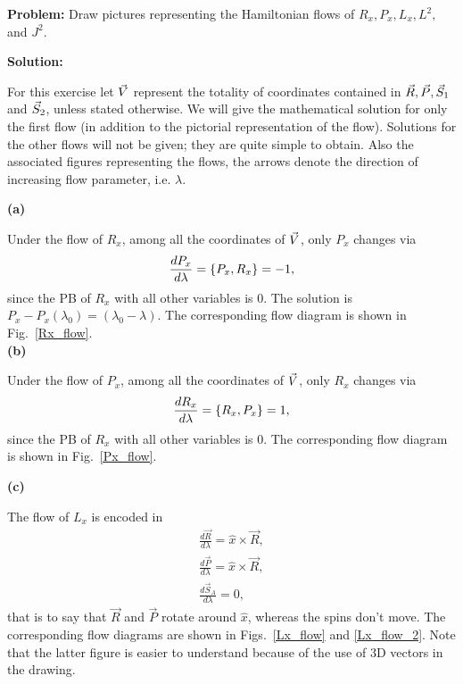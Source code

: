 \begin{Exercise}    \label{exercise-2}
\textbf{Problem:}  Draw pictures representing the Hamiltonian
flows of $R_x, P_x, L_x, L^2,$ and $J^2$.



\textbf{Solution:} 

For this exercise let $\vec{V}$ represent the totality of 
coordinates contained in $\vec{R}, \vec{P}, \vec{S}_1$ and $\vec{S}_2$,
unless stated otherwise.
We will give the mathematical
 solution for only the first flow (in addition to the
pictorial representation of the flow).
Solutions for the other flows will not be given; they are quite
simple to obtain.
Also the associated figures representing the flows,
the arrows denote the direction of
increasing flow parameter, i.e. $\lambda$.






\textbf{(a)}

Under the flow of $R_x$, among all the
coordinates of $\vec{V}$, only $P_x$ changes via
\begin{align}
\frac{d P_x}{d \lambda}  =  \left\lbrace P_x, R_x \right\rbrace = -1,
\end{align}
since the PB of $R_x$ with all other variables is 0. 
The solution is $ P_x - P_x(\lambda_0) = (\lambda_0 -  \lambda).$
The  corresponding flow diagram is shown in
Fig.~\ref{Rx_flow}.\\




\textbf{(b)}

Under the flow of $P_x$, among all the
coordinates of $\vec{V}$, only $R_x$ changes via
\begin{align}
\frac{d R_x}{d \lambda}  =  \left\lbrace R_x, P_x \right\rbrace = 1,
\end{align}
since the PB of $R_x$ with all other variables is 0. The 
corresponding flow diagram is shown in
Fig.~\ref{Px_flow}.





\textbf{(c)}

The flow of $L_x$ is encoded in 
\begin{align}
\frac{d \vec{R}}{d \lambda}=\hat{x} \times \vec{R},   \\
\frac{d \vec{P}}{d \lambda}=\hat{x} \times \vec{R},     \\
\frac{d \vec{S}_A}{d \lambda}=  0,   
\end{align}
that is to say that $\vec{R}$ and $\vec{P}$ rotate around $\hat{x}$,
whereas the spins don't move.
The  corresponding flow diagrams are shown in
Figs.~\ref{Lx_flow} and \ref{Lx_flow_2}. Note that the latter figure
is easier to understand because of the use of 3D vectors in the
drawing.







\end{Exercise}
